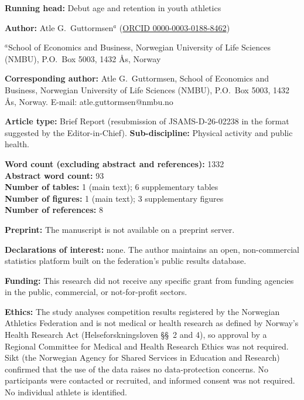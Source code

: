 \documentclass[12pt,a4paper]{article}
\begin{document}

\bigskip
{}

\bigskip
\noindent\textbf{Running head:} Debut age and retention in youth athletics

\bigskip
\noindent\textbf{Author:} Atle G.\ Guttormsen$^{a}$ (\href{https://orcid.org/0000-0003-0188-8462}{ORCID 0000-0003-0188-8462})

\medskip
\noindent $^{a}$School of Economics and Business, Norwegian University of Life Sciences (NMBU), P.O.\ Box 5003, 1432 Ås, Norway

\medskip
\noindent\textbf{Corresponding author:} Atle G.\ Guttormsen, School of Economics and Business, Norwegian University of Life Sciences (NMBU), P.O.\ Box 5003, 1432 Ås, Norway. E-mail: atle.guttormsen@nmbu.no

\bigskip
\noindent\textbf{Article type:} Brief Report (resubmission of JSAMS-D-26-02238 in the format suggested by the Editor-in-Chief). \textbf{Sub-discipline:} Physical activity and public health.

\medskip
\noindent\textbf{Word count (excluding abstract and references):} 1332 \\
\textbf{Abstract word count:} 93 \\
\textbf{Number of tables:} 1 (main text); 6 supplementary tables \\
\textbf{Number of figures:} 1 (main text); 3 supplementary figures \\
\textbf{Number of references:} 8

\medskip
\noindent\textbf{Preprint:} The manuscript is not available on a preprint server.

\medskip
\noindent\textbf{Declarations of interest:} none. The author maintains an open, non-commercial statistics platform built on the federation's public results database.

\medskip
\noindent\textbf{Funding:} This research did not receive any specific grant from funding agencies in the public, commercial, or not-for-profit sectors.

\medskip
\noindent\textbf{Ethics:} The study analyses competition results registered by the Norwegian Athletics Federation and is not medical or health research as defined by Norway's Health Research Act (Helseforskningsloven \S\S~2 and 4), so approval by a Regional Committee for Medical and Health Research Ethics was not required. Sikt (the Norwegian Agency for Shared Services in Education and Research) confirmed that the use of the data raises no data-protection concerns. No participants were contacted or recruited, and informed consent was not required. No individual athlete is identified.
\end{document}
